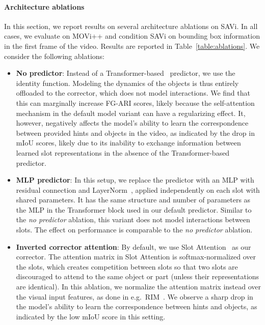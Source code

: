 \documentclass{article}
\begin{document}
\paragraph{Architecture ablations}
\label{app:ablations}
In this section, we report results on several architecture ablations on SAVi. 
In all cases, we evaluate on MOVi++ and condition SAVi on bounding box information in the first frame of the video. Results are reported in Table~\ref{table:ablations}. We consider the following ablations:
\begin{itemize}
    \item \textbf{No predictor}: Instead of a Transformer-based~\citep{vaswani2017attention} predictor, we use the identity function. Modeling the dynamics of the objects is thus entirely offloaded to the corrector, which does not model interactions. We find that this can marginally increase FG-ARI scores, likely because the self-attention mechanism in the default model variant can have a regularizing effect. It, however, negatively affects the model's ability to learn the correspondence between provided hints and objects in the video, as indicated by the drop in mIoU scores, likely due to its inability to exchange information between learned slot representations in the absence of the Transformer-based predictor.
    \item \textbf{MLP predictor}: In this setup, we replace the predictor with an MLP with residual connection and LayerNorm~\citep{ba2016layer}, applied independently on each slot with shared parameters. It has the same structure and number of parameters as the MLP in the Transformer block used in our default predictor. Similar to the \textit{no predictor} ablation, this variant does not model interactions between slots. The effect on performance is comparable to the \textit{no predictor} ablation.
    \item \textbf{Inverted corrector attention}: By default, we use Slot Attention~\citep{locatello2020object} as our corrector. The attention matrix in Slot Attention is softmax-normalized over the slots, which creates competition between slots so that two slots are discouraged to attend to the same object or part (unless their representations are identical). In this ablation, we normalize the attention matrix instead over the visual input features, as done in e.g.~RIM~\citep{goyal2019recurrent}. We observe a sharp drop in the model's ability to learn the correspondence between hints and objects, as indicated by the low mIoU score in this setting.
\end{itemize}
\end{document}

